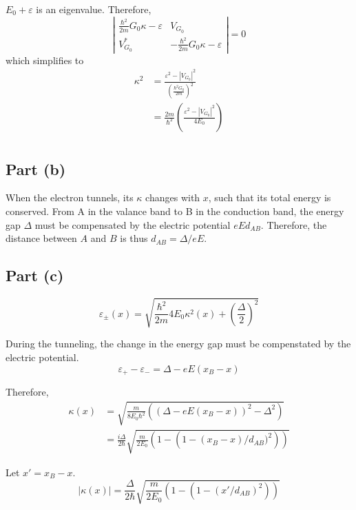 \documentclass{article}
\begin{document}
$E_0+\varepsilon$ is an eigenvalue. Therefore,
\begin{equation*}
\left|\begin{array}{cc}\frac{\hbar^2}{2m}G_0\kappa-\varepsilon&V_{G_0}\\V_{G_0}^*&-\frac{\hbar^2}{2m}G_0\kappa-\varepsilon\end{array}\right|=0
\end{equation*}
which simplifies to
\begin{align*}
\kappa^2&=\frac{\varepsilon^2-|V_{G_0}|^2}{\left(\frac{\hbar^2G_0}{2m}\right)^2}\\
&=\frac{2m}{\hbar^2}\left(\frac{\varepsilon^2-|V_{G_0}|^2}{4E_0}\right)\\
\end{align*}

\subsection{Part (b)}
When the electron tunnels, its $\kappa$ changes with $x$, such that its total energy is conserved. From A in the valance band to B in the conduction band, the energy gap $\Delta$ must be compensated by the electric potential $eEd_{AB}$. Therefore, the distance between $A$ and $B$ is thus $d_{AB}=\Delta/eE$.

\subsection{Part (c)}
\begin{equation*}
\varepsilon_{\pm}(x)=\sqrt{\frac{\hbar^2}{2m}4E_0\kappa^2(x)+\left(\frac{\Delta}{2}\right)^2}
\end{equation*}

During the tunneling, the change in the energy gap must be compenstated by the electric potential.
\begin{equation*}
\varepsilon_+-\varepsilon_-=\Delta-eE(x_B-x)
\end{equation*}

Therefore,
\begin{align*}
\kappa(x)&=\sqrt{\frac{m}{8E_0\hbar^2}\left((\Delta-eE(x_B-x))^2-\Delta^2\right)}\\
&=\frac{i\Delta}{2\hbar}\sqrt{\frac{m}{2E_0}\left(1-\left(1-(x_B-x)/d_{AB})^2\right)\right)}
\end{align*}

Let $x'=x_B-x$.
\begin{equation*}
|\kappa(x)|=\frac{\Delta}{2\hbar}\sqrt{\frac{m}{2E_0}\left(1-\left(1-(x'/d_{AB})^2\right)\right)}
\end{equation*}
\end{document}
